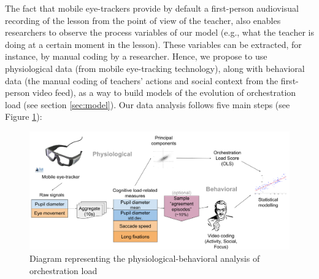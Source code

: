 \documentclass[10pt,journal,compsoc]{IEEEtran}
\begin{document}
The fact that mobile eye-trackers provide by default a first-person audiovisual recording of the lesson from the point of view of the teacher, also enables researchers to observe the process variables of our model (e.g., what the teacher is doing at a certain moment in the lesson). These variables can be extracted, for instance, by manual coding by a researcher. Hence, we propose to use physiological data (from mobile eye-tracking technology), along with behavioral data (the manual coding of teachers' actions and social context from the first-person video feed), as a way to build models of the evolution of orchestration load (see section \ref{sec:model}). Our data analysis follows five main steps (see Figure \ref{fig:analysis}):

\begin{figure}[!t]
\centering
\includegraphics[width=\linewidth]{img/AnalysisMethodBase.png}
\caption{Diagram representing the physiological-behavioral analysis of orchestration load}
\label{fig:analysis}
\end{figure}
\end{document}
